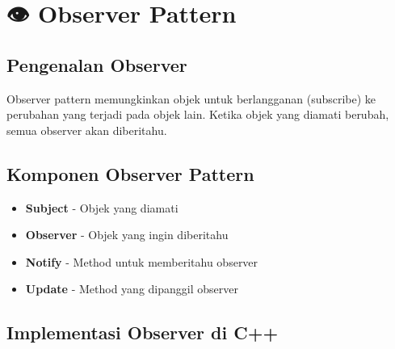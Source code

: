 \section{👁️ Observer Pattern}

\subsection{Pengenalan Observer}

Observer pattern memungkinkan objek untuk berlangganan (subscribe) ke perubahan yang terjadi pada objek lain. Ketika objek yang diamati berubah, semua observer akan diberitahu.

\subsection{Komponen Observer Pattern}

\begin{itemize}
\item \textbf{Subject} - Objek yang diamati
\item \textbf{Observer} - Objek yang ingin diberitahu
\item \textbf{Notify} - Method untuk memberitahu observer
\item \textbf{Update} - Method yang dipanggil observer
\end{itemize}

\subsection{Implementasi Observer di C++}

